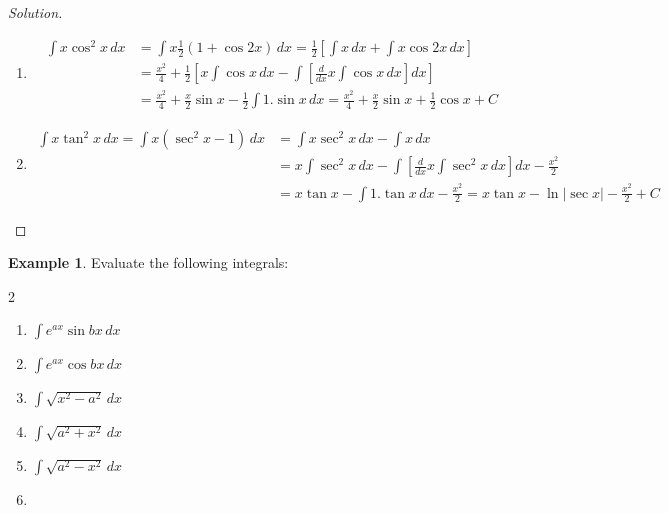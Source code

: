 \documentclass{book}
\theoremstyle{definition}
\newtheorem{example}{Example}[section]
\newenvironment{solution}
    {\begin{proof}[Solution]}
    {\end{proof}}
\begin{document}
\begin{solution}
\begin{enumerate}[label=(\roman*)]
\item 
\begin{align*}
    \int x\cos^2 x\,dx &= \int x\frac{1}{2}(1+\cos 2x)\,dx = \frac{1}{2}\left[\int x\,dx+\int x\cos 2x\,dx\right] \\
    &= \frac{x^2}{4}+\frac{1}{2}\left[x\int\cos x\,dx-\int\left[\frac{d}{dx}x\int\cos x\,dx\right]dx\right] \\
    &= \frac{x^2}{4}+\frac{x}{2}\sin x-\frac{1}{2}\int1.\sin x\,dx = \frac{x^2}{4}+\frac{x}{2}\sin x+\frac{1}{2}\cos x+C
\end{align*}


\item 
\begin{align*}
    \int x\tan^2 x\,dx = \int x(\sec^2 x-1)\,dx &= \int x\sec^2 x\,dx-\int x\,dx \\
    &= x\int \sec^2x\,dx-\int \left[\frac{d}{dx}x\int\sec^2x\,dx\right]dx-\frac{x^2}{2} \\ 
    &= x\tan x-\int 1.\tan x\,dx-\frac{x^2}{2} = x\tan x- \ln|\sec x|-\frac{x^2}{2}+C
\end{align*}


\end{enumerate} 
\end{solution}

\begin{example}
Evaluate the following integrals:
\begin{multicols}{2}

\begin{enumerate}[label=(\roman*)]
    \item $\displaystyle\int e^{ax}\sin bx\,dx$
    \item $\displaystyle\int e^{ax}\cos bx\,dx$
    \item $\displaystyle\int \sqrt{x^2-a^2}\,dx$
    \item $\displaystyle\int \sqrt{a^2+x^2}\,dx$
    \item $\displaystyle\int \sqrt{a^2-x^2}\,dx$
    \item[] \phantom{x}
\end{enumerate}
\end{multicols}    
\end{example}
\end{document}
